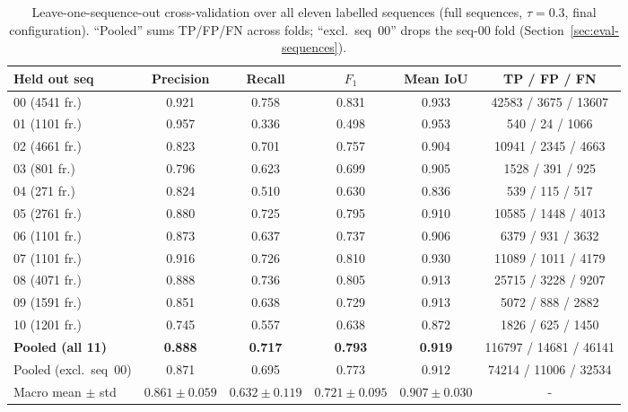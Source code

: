 \begin{table}[H]
  \centering
  \caption[Leave-one-sequence-out cross-validation]{Leave-one-sequence-out cross-validation
    over all eleven labelled sequences (full sequences, $\tau=0.3$, final configuration).
    ``Pooled'' sums TP/FP/FN across folds; ``excl.\ seq~00'' drops the seq-00 fold
    (Section~\ref{sec:eval-sequences}).}
  \label{tab:loso}
  \setlength{\tabcolsep}{3pt}
  \footnotesize
  \begin{tabular}{lccccc}
    \toprule
    Held out seq & Precision & Recall & $F_1$ & Mean IoU & TP / FP / FN \\
    \midrule
    00 (\num{4541} fr.) & 0.921 & 0.758 & 0.831 & 0.933 & \num{42583} / \num{3675} / \num{13607} \\
    01 (\num{1101} fr.) & 0.957 & 0.336 & 0.498 & 0.953 & \num{540} / \num{24} / \num{1066} \\
    02 (\num{4661} fr.) & 0.823 & 0.701 & 0.757 & 0.904 & \num{10941} / \num{2345} / \num{4663} \\
    03 (\num{801} fr.)  & 0.796 & 0.623 & 0.699 & 0.905 & \num{1528} / \num{391} / \num{925} \\
    04 (\num{271} fr.)  & 0.824 & 0.510 & 0.630 & 0.836 & \num{539} / \num{115} / \num{517} \\
    05 (\num{2761} fr.) & 0.880 & 0.725 & 0.795 & 0.910 & \num{10585} / \num{1448} / \num{4013} \\
    06 (\num{1101} fr.) & 0.873 & 0.637 & 0.737 & 0.906 & \num{6379} / \num{931} / \num{3632} \\
    07 (\num{1101} fr.) & 0.916 & 0.726 & 0.810 & 0.930 & \num{11089} / \num{1011} / \num{4179} \\
    08 (\num{4071} fr.) & 0.888 & 0.736 & 0.805 & 0.913 & \num{25715} / \num{3228} / \num{9207} \\
    09 (\num{1591} fr.) & 0.851 & 0.638 & 0.729 & 0.913 & \num{5072} / \num{888} / \num{2882} \\
    10 (\num{1201} fr.) & 0.745 & 0.557 & 0.638 & 0.872 & \num{1826} / \num{625} / \num{1450} \\
    \midrule
    \textbf{Pooled (all 11)} & \textbf{0.888} & \textbf{0.717} & \textbf{0.793} & \textbf{0.919} & \num{116797} / \num{14681} / \num{46141} \\
    Pooled (excl.\ seq~00)   & 0.871 & 0.695 & 0.773 & 0.912 & \num{74214} / \num{11006} / \num{32534} \\
    Macro mean $\pm$ std     & $0.861{\pm}0.059$ & $0.632{\pm}0.119$ & $0.721{\pm}0.095$ & $0.907{\pm}0.030$ &- \\
    \bottomrule
  \end{tabular}
\end{table}

